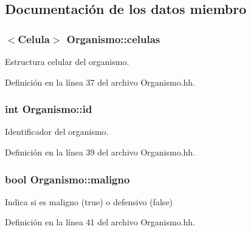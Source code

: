 \subsection{Documentación de los datos miembro}
\subsubsection[{\texorpdfstring{celulas}{celulas}}]{$<${\bf Celula}$>$ Organismo\+::celulas\hspace{0.3cm}{\ttfamily [private]}}\hypertarget{class_organismo_abfafb8e55144e295b406ce90951f0c68}{}\label{class_organismo_abfafb8e55144e295b406ce90951f0c68}


Estructura celular del organismo. 



Definición en la línea 37 del archivo Organismo.\+hh.

\subsubsection[{\texorpdfstring{id}{id}}]{\setlength{\rightskip}{0pt plus 5cm}int Organismo\+::id\hspace{0.3cm}{\ttfamily [private]}}\hypertarget{class_organismo_a30be1823d3711fec651a5a4b1dc1cee5}{}\label{class_organismo_a30be1823d3711fec651a5a4b1dc1cee5}


Identificador del organismo. 



Definición en la línea 39 del archivo Organismo.\+hh.

\subsubsection[{\texorpdfstring{maligno}{maligno}}]{\setlength{\rightskip}{0pt plus 5cm}bool Organismo\+::maligno\hspace{0.3cm}{\ttfamily [private]}}\hypertarget{class_organismo_a85a5d1b9d31fa209d1ed0d596dbbed61}{}\label{class_organismo_a85a5d1b9d31fa209d1ed0d596dbbed61}


Indica si es maligno (true) o defensivo (false) 



Definición en la línea 41 del archivo Organismo.\+hh.

